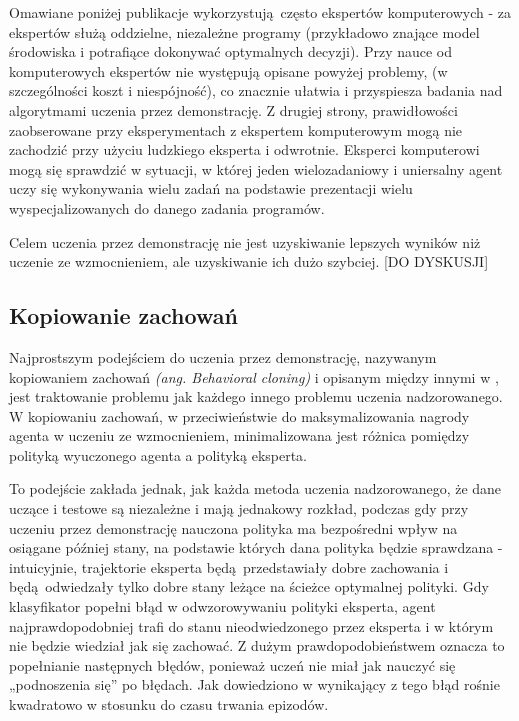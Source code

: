 Omawiane poniżej publikacje wykorzystują często ekspertów komputerowych - za ekspertów służą oddzielne, niezależne programy (przykładowo znające model środowiska i potrafiące dokonywać optymalnych decyzji). Przy nauce od komputerowych ekspertów nie występują opisane powyżej problemy, (w szczególności koszt i niespójność), co znacznie ułatwia i przyspiesza badania nad algorytmami uczenia przez demonstrację. Z drugiej strony, prawidłowości zaobserowane przy eksperymentach z ekspertem komputerowym mogą nie zachodzić przy użyciu ludzkiego eksperta i odwrotnie.
Eksperci komputerowi mogą się sprawdzić w sytuacji, w której jeden wielozadaniowy i uniersalny agent uczy się wykonywania wielu zadań na podstawie prezentacji wielu wyspecjalizowanych do danego zadania programów.

Celem uczenia przez demonstrację nie jest uzyskiwanie lepszych wyników niż uczenie ze wzmocnieniem, ale uzyskiwanie ich dużo szybciej. [DO DYSKUSJI]

\subsection{Kopiowanie zachowań}\label{bcloning}

Najprostszym podejściem do uczenia przez demonstrację, nazywanym kopiowaniem zachowań \textit{(ang. Behavioral cloning)} i opisanym między innymi w \cite{Schaal99isimitation}, jest traktowanie problemu jak każdego innego problemu uczenia nadzorowanego. W kopiowaniu zachowań, w przeciwieństwie do maksymalizowania nagrody agenta w uczeniu ze wzmocnieniem, minimalizowana jest różnica pomiędzy polityką wyuczonego agenta a polityką eksperta.

To podejście zakłada jednak, jak każda metoda uczenia nadzorowanego, że dane uczące i testowe są niezależne i mają jednakowy rozkład, podczas gdy przy uczeniu przez demonstrację nauczona polityka ma bezpośredni wpływ na osiągane później stany, na podstawie których dana polityka będzie sprawdzana - intuicyjnie, trajektorie eksperta będą przedstawiały dobre zachowania i będą odwiedzały tylko dobre stany leżące na ścieżce optymalnej polityki. Gdy klasyfikator popełni błąd w odwzorowywaniu polityki eksperta, agent najprawdopodobniej trafi do stanu nieodwiedzonego przez eksperta i w którym nie będzie wiedział jak się zachować. Z dużym prawdopodobieństwem oznacza to popełnianie następnych błędów, ponieważ uczeń nie miał jak nauczyć się „podnoszenia się” po błędach. Jak dowiedziono w \cite{bagnell2010efficient} wynikający z tego błąd rośnie kwadratowo w stosunku do czasu trwania epizodów.

